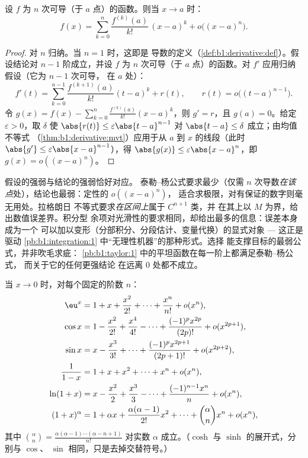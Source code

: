 \begin{theorem}[泰勒–杨公式]\label{thm:b1:taylor:young}
设 $f$ 为 $n$ 次可导（于 $a$ 点）的函数。则当 $x \to a$ 时：
\[
f(x) = \sum_{k=0}^{n} \frac{f^{(k)}(a)}{k!}\,(x-a)^k
+ o\bigl((x-a)^n\bigr) .
\]
\end{theorem}

\begin{proof}
对 $n$ 归纳。当 $n = 1$ 时，这即是
导数的定义（\cref{def:b1:derivative:def}）。假设结论对
$n - 1$ 阶成立，并设 $f$ 为 $n$ 次可导（于 $a$ 点）的函数。对
$f'$ 应用归纳假设（它为 $n-1$ 次可导，
在 $a$ 处）：
\[
f'(t) = \sum_{k=0}^{n-1} \frac{f^{(k+1)}(a)}{k!}(t-a)^k + r(t),
\qquad r(t) = o\bigl((t-a)^{n-1}\bigr).
\]
令 $g(x) = f(x) - \sum_{k=0}^{n} \frac{f^{(k)}(a)}{k!}(x-a)^k$，则
$g' = r$，且 $g(a) = 0$。给定 $\varepsilon > 0$，取 $\delta$
使 $\abs{r(t)} \leq \varepsilon\abs{t - a}^{n-1}$ 对 $\abs{t-a}
\leq \delta$ 成立；由均值不等式
（\cref{thm:b1:derivative:mvt}）应用于从 $a$ 到
$x$ 的线段（此时 $\abs{g'} \leq \varepsilon\abs{x-a}^{n-1}$），得
$\abs{g(x)} \leq \varepsilon\abs{x - a}^n$，即 $g(x) =
o((x-a)^n)$。
\end{proof}

\begin{remark}
假设的强弱与结论的强弱恰好对应。
泰勒–杨公式要求最少（仅需 $n$ 次导数\emph{在该
点}处），结论也最弱：定性的 $o((x-a)^n)$，
适合求极限，对有保证的数字则毫无用处。拉格朗日
不等式要求\emph{在区间上}属于 $C^{n+1}$ 类，并
在其上以 $M$ 为界，给出数值误差界。积分型
余项对光滑性的要求相同，却给出最多的信息：误差本身成为一个
可以加以变形（分部积分、分段估计、变量代换）的显式对象
--- 这正是驱动
\cref{pb:b1:integration:1} 中“无理性机器”的那种形式。选择
能支撑目标的最弱公式，并非吹毛求疵：
\cref{pb:b1:taylor:1} 中的平坦函数在每一阶上都满足泰勒–杨公式，
而关于它的任何更强结论
在远离 $0$ 处都不成立。
\end{remark}

\begin{proposition}[$0$ 处的标准展开式]
当 $x \to 0$ 时，对每个固定的阶数 $n$：
\begin{align*}
\eu^x &= 1 + x + \frac{x^2}{2!} + \dots + \frac{x^n}{n!} + o(x^n),\\
\cos x &= 1 - \frac{x^2}{2!} + \frac{x^4}{4!} - \dots
+ \frac{(-1)^p x^{2p}}{(2p)!} + o(x^{2p+1}),\\
\sin x &= x - \frac{x^3}{3!} + \dots + \frac{(-1)^p
x^{2p+1}}{(2p+1)!} + o(x^{2p+2}),\\
\frac{1}{1 - x} &= 1 + x + x^2 + \dots + x^n + o(x^n),\\
\ln(1 + x) &= x - \frac{x^2}{2} + \frac{x^3}{3} - \dots +
\frac{(-1)^{n-1} x^n}{n} + o(x^n),\\
(1 + x)^\alpha &= 1 + \alpha x + \frac{\alpha(\alpha-1)}{2!}x^2 +
\dots + \binom{\alpha}{n} x^n + o(x^n),
\end{align*}
其中 $\binom{\alpha}{n} = \frac{\alpha(\alpha - 1)\cdots(\alpha - n
+ 1)}{n!}$ 对实数 $\alpha$ 成立。（$\cosh$ 与 $\sinh$ 的展开式，分别与 $\cos$、
$\sin$ 相同，只是去掉交替符号。）
\label{prop:b1:taylor:standard}
\end{proposition}

